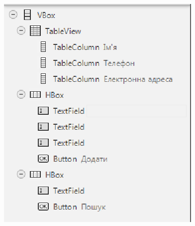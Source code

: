 \begin{figure}[h]
	\includegraphics{javafx/images/image2.png}
	\caption{}
	\label{fig16:image2}
\end{figure}


